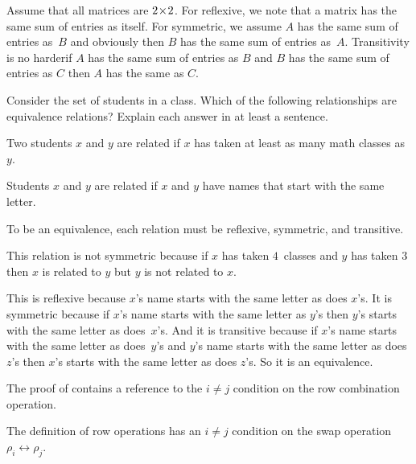 \begin{exercises}
\begin{answer}
      Assume that all matrices are $2 \! \times \! 2$.
      For reflexive, we note that a matrix has the same sum of entries as
      itself.
      For symmetric, we assume $A$ has the same sum of entries as~$B$ 
      and obviously then $B$ has the same sum of entries as~$A$.
      Transitivity is no harder\Dash if $A$ has the same sum of entries
      as $B$ and $B$ has the same sum of entries as $C$ then 
      $A$ has the same as $C$.
    \end{answer}
 \item \cite{Cleary}
  Consider the set of students in a class.  
  Which of the following relationships are equivalence relations?  
  Explain each answer in at least a sentence.
  \begin{exparts}
    \item  Two students $x$ and $y$ are related 
      if $x$ has taken at least as many 
      math classes as $y$.
    \item Students $x$ and $y$ are related if $x$ and $y$ have names 
      that start with the same letter.
  \end{exparts}
  \begin{answer}
    To be an equivalence, each relation must be reflexive, symmetric, and
    transitive.
    \begin{exparts}
      \item This relation 
        is not symmetric because if $x$ has taken $4$~classes and $y$
        has taken $3$ then $x$ is related to $y$ but $y$ is not related
        to $x$.
      \item This is reflexive because $x$'s name starts with the same
        letter as does $x$'s.
        It is symmetric because if $x$'s name starts with the same letter 
        as $y$'s then $y$'s starts with the same letter as does~$x$'s.
        And it is transitive because if $x$'s name starts with the same letter
        as does~$y$'s and $y$'s name starts with the same letter as 
        does $z$'s then $x$'s starts with the same letter as does $z$'s.
        So it is an equivalence.
    \end{exparts}
  \end{answer}
 \item \label{exer:INotJMakesRowOpsRev}
   The proof of  contains a reference to the 
   $i\neq j$ condition on the row combination operation.
   \begin{exparts}
     \partsitem The definition of row operations has an $i\neq j$ condition on
        the swap operation $\rho_i\leftrightarrow\rho_j$. 

\end{exparts}
\end{exercises}
